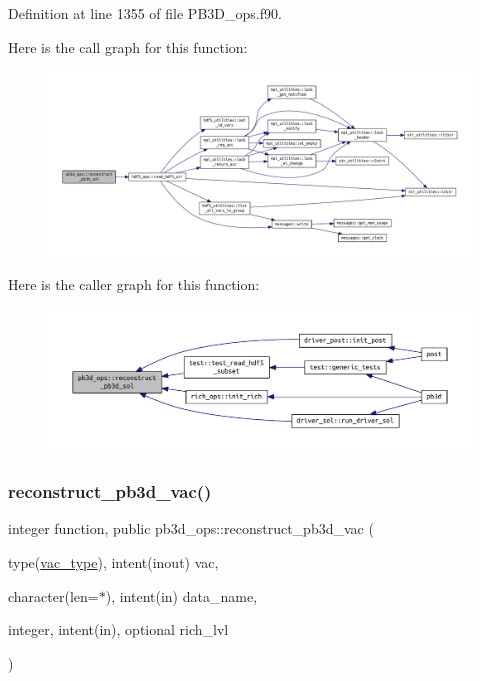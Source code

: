 Definition at line 1355 of file P\+B3\+D\+\_\+ops.\+f90.

Here is the call graph for this function\+:\nopagebreak
\begin{figure}[H]
\begin{center}
\leavevmode
\includegraphics[width=350pt]{namespacepb3d__ops_ae7afc544227f34f2877eb5a14d620823_cgraph}
\end{center}
\end{figure}
Here is the caller graph for this function\+:\nopagebreak
\begin{figure}[H]
\begin{center}
\leavevmode
\includegraphics[width=350pt]{namespacepb3d__ops_ae7afc544227f34f2877eb5a14d620823_icgraph}
\end{center}
\end{figure}
\mbox{\label{namespacepb3d__ops_a281c496a42c4ea46606e929e10d51582}} 
\subsubsection{\texorpdfstring{reconstruct\+\_\+pb3d\+\_\+vac()}{reconstruct\_pb3d\_vac()}}
{\footnotesize\ttfamily integer function, public pb3d\+\_\+ops\+::reconstruct\+\_\+pb3d\+\_\+vac (\begin{DoxyParamCaption}\item[{type(\hyperlink{structvac__vars_1_1vac__type}{vac\+\_\+type}), intent(inout)}]{vac,  }\item[{character(len=$\ast$), intent(in)}]{data\+\_\+name,  }\item[{integer, intent(in), optional}]{rich\+\_\+lvl }\end{DoxyParamCaption})}



